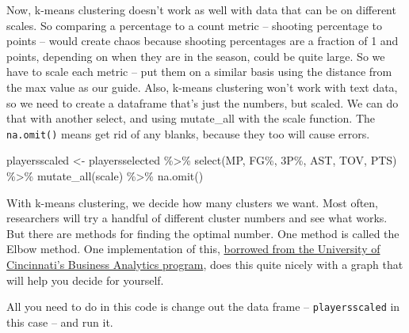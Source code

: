 \documentclass[
]{book}
\newenvironment{Shaded}{\begin{snugshade}}{\end{snugshade}}
\newcommand{\AttributeTok}[1]{\textcolor[rgb]{0.77,0.63,0.00}{#1}}
\newcommand{\CommentTok}[1]{\textcolor[rgb]{0.56,0.35,0.01}{\textit{#1}}}
\newcommand{\ControlFlowTok}[1]{\textcolor[rgb]{0.13,0.29,0.53}{\textbf{#1}}}
\newcommand{\DecValTok}[1]{\textcolor[rgb]{0.00,0.00,0.81}{#1}}
\newcommand{\FunctionTok}[1]{\textcolor[rgb]{0.00,0.00,0.00}{#1}}
\newcommand{\NormalTok}[1]{#1}
\newcommand{\OtherTok}[1]{\textcolor[rgb]{0.56,0.35,0.01}{#1}}
\newcommand{\SpecialCharTok}[1]{\textcolor[rgb]{0.00,0.00,0.00}{#1}}
\newcommand{\StringTok}[1]{\textcolor[rgb]{0.31,0.60,0.02}{#1}}
\begin{document}
Now, k-means clustering doesn't work as well with data that can be on different scales. So comparing a percentage to a count metric -- shooting percentage to points -- would create chaos because shooting percentages are a fraction of 1 and points, depending on when they are in the season, could be quite large. So we have to scale each metric -- put them on a similar basis using the distance from the max value as our guide. Also, k-means clustering won't work with text data, so we need to create a dataframe that's just the numbers, but scaled. We can do that with another select, and using mutate\_all with the scale function. The \texttt{na.omit()} means get rid of any blanks, because they too will cause errors.

\begin{Shaded}
\begin{Highlighting}[]
\NormalTok{playersscaled }\OtherTok{\textless{}{-}}\NormalTok{ playersselected }\SpecialCharTok{\%\textgreater{}\%} 
  \FunctionTok{select}\NormalTok{(MP, }\StringTok{\textasciigrave{}}\AttributeTok{FG\%}\StringTok{\textasciigrave{}}\NormalTok{, }\StringTok{\textasciigrave{}}\AttributeTok{3P\%}\StringTok{\textasciigrave{}}\NormalTok{, AST, TOV, PTS) }\SpecialCharTok{\%\textgreater{}\%} 
  \FunctionTok{mutate\_all}\NormalTok{(scale) }\SpecialCharTok{\%\textgreater{}\%} 
  \FunctionTok{na.omit}\NormalTok{()}
\end{Highlighting}
\end{Shaded}

With k-means clustering, we decide how many clusters we want. Most often, researchers will try a handful of different cluster numbers and see what works. But there are methods for finding the optimal number. One method is called the Elbow method. One implementation of this, \href{https://uc-r.github.io/kmeans_clustering}{borrowed from the University of Cincinnati's Business Analytics program}, does this quite nicely with a graph that will help you decide for yourself.

All you need to do in this code is change out the data frame -- \texttt{playersscaled} in this case -- and run it.

\begin{Shaded}
\end{Shaded}
\end{document}
